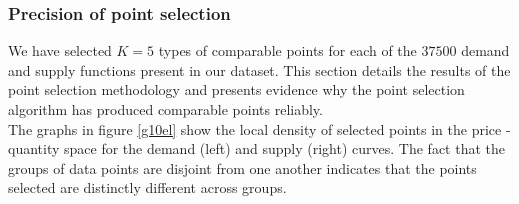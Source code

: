 \subsubsection{Precision of point selection}
We have selected $K=5$ types of comparable points for each of the $37500$ demand and supply functions present in our dataset. This section details the results of the point selection methodology and presents evidence why the point selection algorithm has produced comparable points reliably. \\

The graphs in figure \ref{g10el} %
 show the local density of selected points in the price - quantity space for the demand (left) and supply (right) curves.
The fact that the groups of data points are disjoint from one another indicates that the points selected are distinctly different across groups. \\

